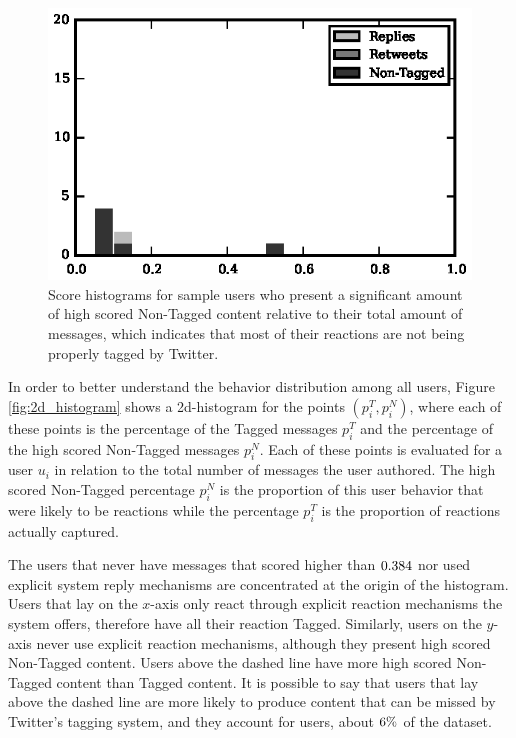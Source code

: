 \begin{figure}[!tb]
\includegraphics[scale=0.9]{./figures/196322186_histogram.eps}
\caption{Score histograms for sample users who present a significant amount of high scored Non-Tagged content relative to their total amount of messages, which indicates that most of their reactions are not being properly tagged by Twitter.}
\label{fig:users_reponse_histograms}
\end{figure}


In order to better understand the behavior distribution among all users, Figure \ref{fig:2d_histogram} shows a 2d-histogram for the points $(p_i^T, p_i^N)$, where each of these points is the percentage of the Tagged messages $p_i^T$ and the percentage of the high scored Non-Tagged messages $p_i^N$.  Each of these points is evaluated for a user $u_i$ in relation to the total number of messages the user authored.
The high scored Non-Tagged percentage $p_i^N$ is the proportion of this user behavior that were likely to be reactions while the percentage $p_i^T$ is the proportion of reactions actually captured.


The \usersScoreZero{} users that never have messages that scored higher than $0.384{}$ nor used explicit system reply mechanisms are concentrated at the origin of the histogram.
Users that lay on the $x$-axis only react through explicit reaction mechanisms the system offers, therefore have all their reaction Tagged. Similarly, users on the $y$-axis never use explicit reaction mechanisms, although they present high scored Non-Tagged content. Users above the dashed line have more high scored Non-Tagged content than Tagged content. It is possible to say that users that lay above the dashed line are more likely to produce content that can be missed by Twitter's tagging system, and they account for \usersAboveLine{} users, about $6{}\%$ of the dataset. 

